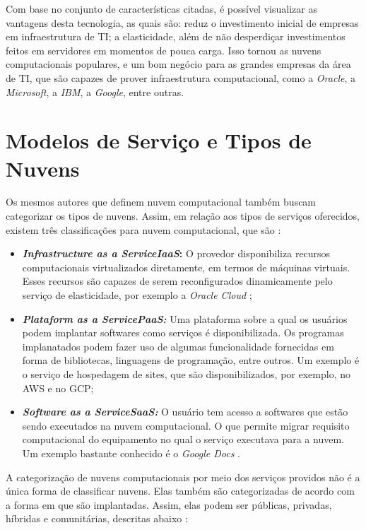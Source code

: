 Com base no conjunto de características citadas, é possível visualizar as vantagens desta tecnologia, as quais são: reduz o investimento inicial de empresas em infraestrutura de TI; a elasticidade, além de não desperdiçar investimentos feitos em servidores em momentos de pouca carga. Isso tornou as nuvens computacionais populares, e um bom negócio para as grandes empresas da área de \acrfull{TI}, que são capazes de prover infraestrutura computacional, como a \textit{Oracle}, a \textit{Microsoft}, a \textit{IBM}, a \textit{Google}, entre outras.

\section{Modelos de Serviço e Tipos de Nuvens}

Os mesmos autores que definem nuvem computacional também buscam categorizar os tipos de nuvens. Assim, em relação aos tipos de serviços oferecidos, existem três classificações para nuvem computacional, que são \cite{NIST_CLOUD_DEFINITION} \cite{Vaquero:2008:BCT:1496091.1496100_Cloud_definition}:

\begin{itemize}
	\item \textbf{\textit{Infrastructure as a Service\acrshort{IaaS}}: } O provedor disponibiliza recursos computacionais virtualizados diretamente, em termos de máquinas virtuais. Esses recursos são capazes de serem reconfigurados dinamicamente pelo serviço de elasticidade, por exemplo a \textit{Oracle Cloud} \cite{OracleCloud};
	\item \textbf{\textit{Plataform as a Service\acrshort{PaaS}: } } Uma plataforma sobre a qual os usuários podem implantar softwares como serviços é disponibilizada. Os programas implanatados podem fazer uso de algumas funcionalidade fornecidas em forma de bibliotecas, linguagens de programação, entre outros. Um exemplo é o serviço de hospedagem de sites\cite{PaaS_Hosting}, que são disponibilizados, por exemplo, no \acrfull{AWS}\cite{AWS_GPU} e no \acrfull{GCP}\cite{Google_Cloud_GPU};
	\item \textbf{\textit{Software as a Service\acrshort{SaaS}:} } O usuário tem acesso a softwares que estão sendo executados na nuvem computacional. O que permite migrar requisito computacional do equipamento no qual o serviço executava para a nuvem. Um exemplo bastante conhecido é o \textit{Google Docs} \cite{GoogleDocs}.
\end{itemize}

A categorização de nuvens computacionais por meio dos serviços providos não é a única forma de classificar nuvens. Elas também são categorizadas de acordo com a forma em que são implantadas. Assim, elas podem ser públicas, privadas, híbridas e comunitárias, descritas abaixo \cite{NIST_CLOUD_DEFINITION}:

